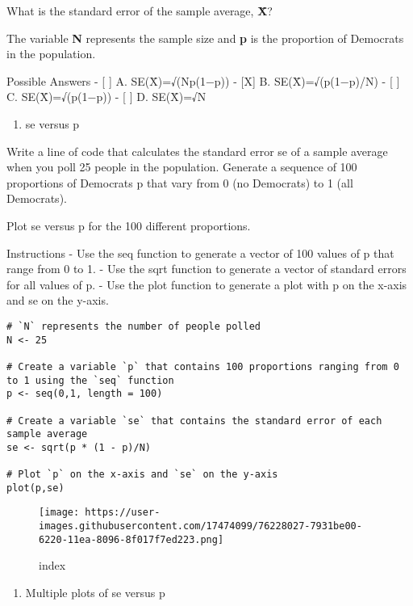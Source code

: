 \documentclass[
]{article}
\providecommand{\tightlist}{%
  \setlength{\itemsep}{0pt}\setlength{\parskip}{0pt}}
\begin{document}
What is the standard error of the sample average, \textbf{X̄}?

The variable \textbf{N} represents the sample size and \textbf{p} is the
proportion of Democrats in the population.

Possible Answers - {[} {]} A. SE(X̄)=√(Np(1−p)) - {[}X{]} B.
SE(X̄)=√(p(1−p)/N) - {[} {]} C. SE(X̄)=√(p(1−p)) - {[} {]} D. SE(X̄)=√N

\begin{enumerate}
\def\labelenumi{\arabic{enumi}.}
\setcounter{enumi}{4}
\tightlist
\item
  se versus p
\end{enumerate}

Write a line of code that calculates the standard error se of a sample
average when you poll 25 people in the population. Generate a sequence
of 100 proportions of Democrats p that vary from 0 (no Democrats) to 1
(all Democrats).

Plot se versus p for the 100 different proportions.

Instructions - Use the seq function to generate a vector of 100 values
of p that range from 0 to 1. - Use the sqrt function to generate a
vector of standard errors for all values of p. - Use the plot function
to generate a plot with p on the x-axis and se on the y-axis.

\begin{verbatim}
# `N` represents the number of people polled
N <- 25

# Create a variable `p` that contains 100 proportions ranging from 0 to 1 using the `seq` function
p <- seq(0,1, length = 100)

# Create a variable `se` that contains the standard error of each sample average
se <- sqrt(p * (1 - p)/N)

# Plot `p` on the x-axis and `se` on the y-axis
plot(p,se)
\end{verbatim}

\begin{figure}
\centering
\texttt{[image: https://user-images.githubusercontent.com/17474099/76228027-7931be00-6220-11ea-8096-8f017f7ed223.png]}
\caption{index}
\end{figure}

\begin{enumerate}
\def\labelenumi{\arabic{enumi}.}
\setcounter{enumi}{5}
\tightlist
\item
  Multiple plots of se versus p
\end{enumerate}
\end{document}
